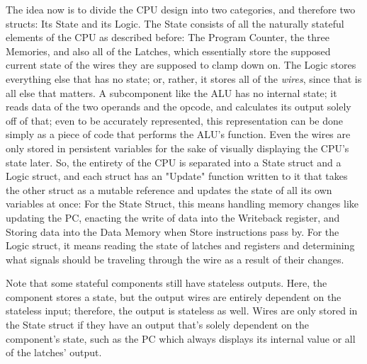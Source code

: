 \documentclass[12pt,twoside]{reedthesis}
\begin{document}
The idea now is to divide the CPU design into two categories, and therefore two structs: Its State and its Logic. The State consists of all the naturally  stateful elements of the CPU as described before: The Program Counter, the three Memories, and also all of the Latches, which essentially store the supposed current state of the wires they are supposed to clamp down on. The Logic stores everything else that has no state; or, rather, it stores all of the \textit{wires}, since that is all else that matters. A subcomponent like the ALU has no internal state; it reads data of the two operands and the opcode, and calculates its output solely off of that; even to be accurately represented, this representation can be done simply as a piece of code that performs the ALU's function. Even the wires are only stored in persistent variables for the sake of visually displaying the CPU's state later. So, the entirety of the CPU is separated into a State struct and a Logic struct, and each struct has an "Update" function written to it that takes the other struct as a mutable reference and  updates the state of all its own variables at once: For the State Struct, this means handling memory changes like updating the PC, enacting the write of data into the Writeback register, and Storing data into the Data Memory when Store instructions pass by. For the Logic struct, it means reading the state of latches and registers and determining what signals should be traveling through the wire as a result of their changes.

Note that some stateful components still have stateless outputs. Here, the component stores a state, but the output wires are entirely dependent on the stateless input; therefore, the output is stateless as well. Wires are only stored in the State struct if they have an output that's solely dependent on the component's state, such as the PC which always displays its internal value or all of the latches' output.
\end{document}
